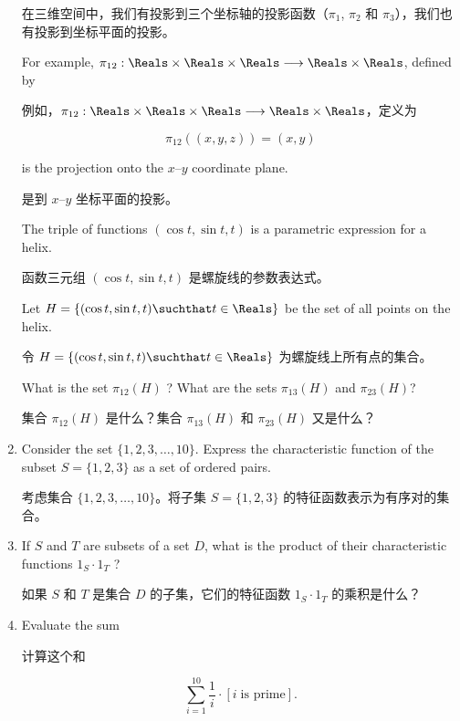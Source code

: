 \begin{enumerate}
    \noindent 在三维空间中，我们有投影到三个坐标轴的投影函数（$\pi_1$, $\pi_2$ 和 $\pi_3$），我们也有投影到坐标平面的投影。
    
    For example,
    $\pi_{12}: \Reals \times \Reals \times \Reals \longrightarrow \Reals \times \Reals$, defined by
    
    例如，$\pi_{12}: \Reals \times \Reals \times \Reals \longrightarrow \Reals \times \Reals$，定义为
    
    \[ \pi_{12}((x,y,z)) = (x,y) \]
    
    \noindent is the projection onto the $x$--$y$ coordinate plane.
    
    \noindent 是到 $x$--$y$ 坐标平面的投影。
    
    The triple of functions  $(\cos{t}, \sin{t}, t)$ is a parametric
    expression for a helix.
    
    函数三元组 $(\cos{t}, \sin{t}, t)$ 是螺旋线的参数表达式。
    
    Let 
    $H = \{ (\cos{t}, \sin{t}, t) \suchthat t \in \Reals \}$ be the set of all
    points on the helix.
    
    令 $H = \{ (\cos{t}, \sin{t}, t) \suchthat t \in \Reals \}$ 为螺旋线上所有点的集合。
    
    What is the set $\pi_{12}(H)$ ?  What are the
    sets $\pi_{13}(H)$ and $\pi_{23}(H)$?
    
    集合 $\pi_{12}(H)$ 是什么？集合 $\pi_{13}(H)$ 和 $\pi_{23}(H)$ 又是什么？
    
    \wbvfill
    
    \workbookpagebreak
    
    \item Consider the set $\{1, 2, 3, \ldots, 10\}$.  Express the characteristic
    function of the subset $S = \{1, 2, 3 \}$ as a set of ordered pairs.
    
    \noindent 考虑集合 $\{1, 2, 3, \ldots, 10\}$。将子集 $S = \{1, 2, 3 \}$ 的特征函数表示为有序对的集合。
    
    \wbvfill
    
    
    \item If $S$ and $T$ are subsets of a set $D$, what is the product of
    their characteristic functions $1_S \cdot 1_T$ ?
    
    \noindent 如果 $S$ 和 $T$ 是集合 $D$ 的子集，它们的特征函数 $1_S \cdot 1_T$ 的乘积是什么？
    
    \wbvfill
    
    
    \item Evaluate the sum
    
    \noindent 计算这个和
    
    \[ \sum_{i=1}^{10} \frac{1}{i} \cdot [ i \; \mbox{is prime} ].
    \]
    
    \wbvfill
    
    \workbookpagebreak
    \end{enumerate}
    
